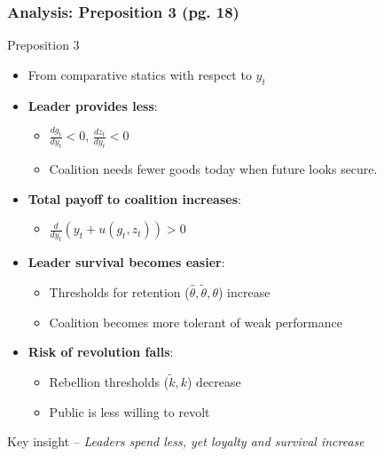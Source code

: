 \documentclass[10pt,handout]{beamer}
\begin{document}
\begin{frame}
\frametitle{Analysis: Preposition 3 (pg. 18)}
\vfill
\begin{block}{Preposition 3}
    \begin{itemize}
        \item[] From comparative statics with respect to $y_t$
        \item \textbf{Leader provides less}:
        \begin{itemize}
            \item $\frac{d g_t}{d y_t} < 0$, \quad $\frac{d z_t}{d y_t} < 0$
            \item Coalition needs fewer goods today when future looks secure.
        \end{itemize}
        
        \item \textbf{Total payoff to coalition increases}:
        \begin{itemize}
            \item $\frac{d}{d y_t}(y_t + u(g_t, z_t)) > 0$
        \end{itemize}
        
        \item \textbf{Leader survival becomes easier}:
        \begin{itemize}
            \item Thresholds for retention ($\hat{\theta}, \tilde{\theta}, \theta$) increase
            \item Coalition becomes more tolerant of weak performance
        \end{itemize}
        
        \item \textbf{Risk of revolution falls}:
        \begin{itemize}
            \item Rebellion thresholds ($\tilde{k}, k$) decrease
            \item Public is less willing to revolt
        \end{itemize}
    \end{itemize}
    Key insight -- \textit{Leaders spend less, yet loyalty and survival increase}
\end{block}
\end{frame}
\end{document}
